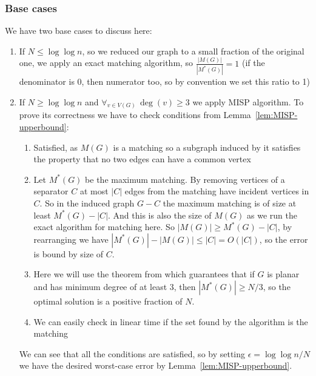 \subsubsection{Base cases}
We have two base cases to discuss here:
\begin{enumerate}
    \item If $N \leq \log{\log{n}}$, so we reduced our graph to a small fraction
        of the original one, we apply an exact matching algorithm, so
        $\frac{|M(G)|}{|M^*(G)|} = 1$ (if the denominator is 0, then numerator too, so by convention
        we set this ratio to 1)
    \item If $N \geq \log\log n$ and $\forall_{v \in V(G)} \, \deg(v) \geq 3$
        we apply \textsc{MISP} algorithm. To prove its correctness we have to check conditions
        from Lemma~\ref{lem:MISP-upperbound}:
        \begin{enumerate}
            \item Satisfied, as $M(G)$ is a matching so a subgraph induced by it
                satisfies the property that no two edges can have a common
                vertex
            \item Let $M^*(G)$ be the maximum matching. By removing vertices of
                a separator $C$ at most $|C|$ edges from the matching have
                incident vertices in $C$. So in the induced graph $G - C$ the
                maximum matching is of size at least $M^*(G) - |C|$. And this is
                also the size of $M(G)$ as we run the exact algorithm for
                matching here. So $|M(G)| \geq M^*(G) - |C|$, by rearranging we
                have $|M^*(G)| - |M(G)| \leq |C| = O(|C|)$, so the error is bound
                by size of $C$.
            \item Here we will use the theorem from \cite{nishizeki1979lower}
                which guarantees that if $G$ is planar and has minimum degree of
                at least 3, then $|M^*(G)| \geq N/3$, so the optimal solution is a
                positive fraction of $N$.
            \item We can easily check in linear time if the set found by the
                algorithm is the matching
        \end{enumerate}
        We can see that all the conditions are satisfied, so by setting
        $\epsilon = \log{\log{n}}/N$ we have the desired worst-case error by
        Lemma~\ref{lem:MISP-upperbound}.
\end{enumerate}

